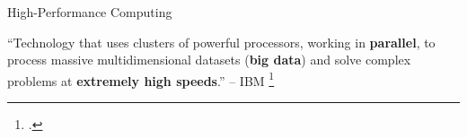 \documentclass[10pt,aspectratio=169]{beamer}
\begin{document}
\begin{frame}{High-Performance Computing}
    \begin{displayquote}
        \vspace{0.2cm}
        ``Technology that uses clusters of powerful processors, working in \textbf{parallel}, to process massive multidimensional datasets (\textbf{big data}) and solve complex problems at \textbf{extremely high speeds}.'' -- IBM \footcite{WhatHPCIntroduction}
    \end{displayquote}
\end{frame}
\end{document}
